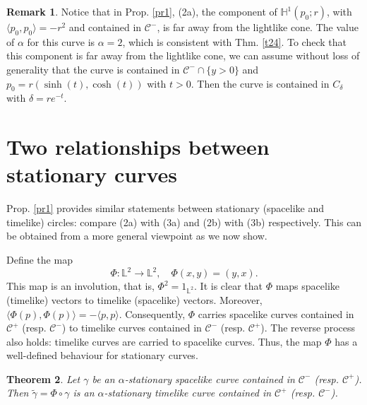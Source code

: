 \documentclass[a4paper,12pt]{amsart}
\newtheorem{theorem}{Theorem}[section]
\theoremstyle{definition}
\newtheorem{remark}[theorem]{Remark}
\def\h{\mathbb H}
\def\l{\mathbb L}
\begin{document}
\begin{remark} Notice that in Prop. \ref{pr1}, (2a), the component of $\h^1(p_0;r)$, with $\langle p_0,p_0\rangle=-r^2$ and contained in $\mathcal{C}^{-}$, is far away from the lightlike cone.  The value of $\alpha$ for this curve is $\alpha=2$, which is consistent with Thm. \ref{t24}. To check that this component is far away from the lightlike cone, we can assume without loss of generality that the curve is contained in $\mathcal{C}^{-}\cap \{y>0\}$ and $p_0=r(\sinh(t),\cosh(t))$ with $t>0$. Then the curve is contained in $C_\delta$ with $\delta=re^{-t}$.
\end{remark}
\section{Two relationships between stationary    curves}\label{s3}

Prop. \ref{pr1} provides similar statements between stationary (spacelike and timelike) circles: compare (2a) with (3a) and (2b) with (3b) respectively. This can be obtained from a more general viewpoint as we now show. 

Define the map 
$$\Phi\colon\l^2\to\l^2,\quad \Phi(x,y)=(y,x).$$
This map is an involution, that is,   $\Phi^2=1_{\l^2}$.   It is clear that $\Phi$ maps spacelike (timelike) vectors to timelike (spacelike) vectors. Moreover,  $\langle\Phi(p),\Phi(p)\rangle=-\langle p,p\rangle$. Consequently, $\Phi$ carries   spacelike curves  contained in $\mathcal{C}^+$ (resp. $\mathcal{C}^-$) to timelike curves contained in $\mathcal{C}^-$ (resp. $\mathcal{C}^+$). The reverse process also holds: timelike curves are carried to spacelike curves. Thus, the map $\Phi$ has a well-defined behaviour for stationary curves.
 
 


\begin{theorem}\label{t31}
 Let $\gamma$ be an $\alpha$-stationary spacelike curve contained in $\mathcal{C}^-$ (resp. $\mathcal{C}^+$). Then   $\widetilde{\gamma}=\Phi\circ\gamma$ is an $\alpha$-stationary timelike curve contained in $\mathcal{C}^+$ (resp. $\mathcal{C}^-$).   
\end{theorem} 
 
\end{document}
